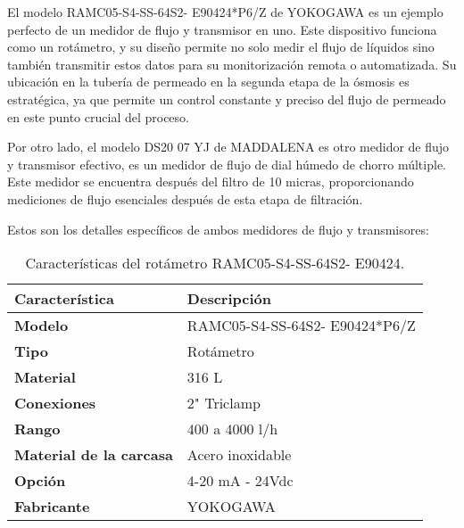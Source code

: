 El modelo RAMC05-S4-SS-64S2- E90424*P6/Z de YOKOGAWA es un ejemplo perfecto de un medidor de flujo y transmisor en uno.
Este dispositivo funciona como un rotámetro, y su diseño permite no solo medir el flujo de líquidos sino también transmitir
estos datos para su monitorización remota o automatizada. Su ubicación en la tubería de permeado en la segunda etapa de la
ósmosis es estratégica, ya que permite un control constante y preciso del flujo de permeado en este punto crucial del proceso.

Por otro lado, el modelo DS20 07 YJ de MADDALENA es otro medidor de flujo y transmisor efectivo,  es un medidor de flujo de dial húmedo de chorro múltiple.
Este medidor se encuentra después del
filtro de 10 micras, proporcionando mediciones de flujo esenciales después de esta etapa de filtración.



Estos son los detalles específicos de ambos medidores de flujo y transmisores:\\



\begin{table}[H]
    \centering
    \caption{Características del rotámetro RAMC05-S4-SS-64S2- E90424.}
    \label{table:sensor_transmisor_flujo}
    \begin{tabular}{| L{6cm} | L{6cm} |}
        \hline
        \textbf{Característica}         & \textbf{Descripción}           \\
        \hline
        \textbf{Modelo}                 & RAMC05-S4-SS-64S2- E90424*P6/Z \\
        \hline
        \textbf{Tipo}                   & Rotámetro                      \\
        \hline
        \textbf{Material}               & 316 L                          \\
        \hline
        \textbf{Conexiones}             & 2" Triclamp                    \\
        \hline
        \textbf{Rango}                  & 400 a 4000 l/h                 \\
        \hline
        \textbf{Material de la carcasa} & Acero inoxidable               \\
        \hline
        \textbf{Opción}                 & 4-20 mA - 24Vdc                \\
        \hline
        \textbf{Fabricante}             & YOKOGAWA                       \\
        \hline
    \end{tabular}
\end{table}

